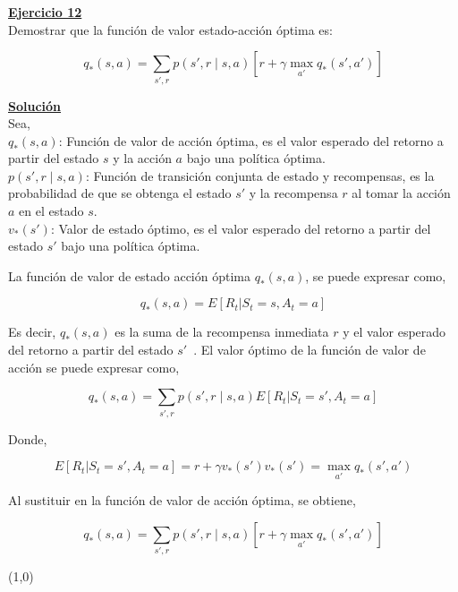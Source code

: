 \indent\underline{\textbf{Ejercicio 12}}\\
Demostrar que la función de valor estado-acción óptima es:

\[
    q_{\ast}(s,a) = \sum_{s',r} p(s',r \mid s,a) \left[ r + \gamma \max_{a'} q_{\ast}(s',a') \right]
\]

\indent\underline{\textbf{Solución}}\\
Sea,\\
$q_{\ast}(s,a)$: Función de valor de acción óptima, es el valor esperado del retorno a partir del estado $s$ y la acción $a$ bajo una política óptima.\\
$p(s',r \mid s,a)$: Función de transición conjunta de estado y recompensas, es la probabilidad de que se obtenga el estado $s'$ y la recompensa $r$ al tomar la acción $a$ en el estado $s$.\\
$v_{\ast}(s')$: Valor de estado óptimo, es el valor esperado del retorno a partir del estado $s'$ bajo una política óptima.

La función de valor de estado acción óptima $q_{\ast}(s,a)$, se puede expresar como,

\[
    q_{\ast}(s,a) = E[R_t | S_t = s, A_t = a]
\]

Es decir, $q_{\ast}(s,a)$ es la suma de la recompensa inmediata $r$ y el valor esperado del retorno a partir del estado $s'$~\cite{Sutton2018}.
El valor óptimo de la función de valor de acción se puede expresar como,

\[
    q_{\ast}(s,a) = \sum_{s',r} p(s',r \mid s,a) E[R_t | S_t = s', A_t = a]
\]

Donde,

\[
    E[R_t | S_t = s', A_t = a] = r + \gamma v_{\ast}(s')
    v_{\ast}(s') = \max_{a'} q_{\ast}(s',a')
\]

Al sustituir en la función de valor de acción óptima, se obtiene,

\[
    q_{\ast}(s,a) = \sum_{s',r} p(s',r \mid s,a) \left[ r + \gamma \max_{a'} q_{\ast}(s',a') \right]
\]

\line(1,0){\textwidth}
